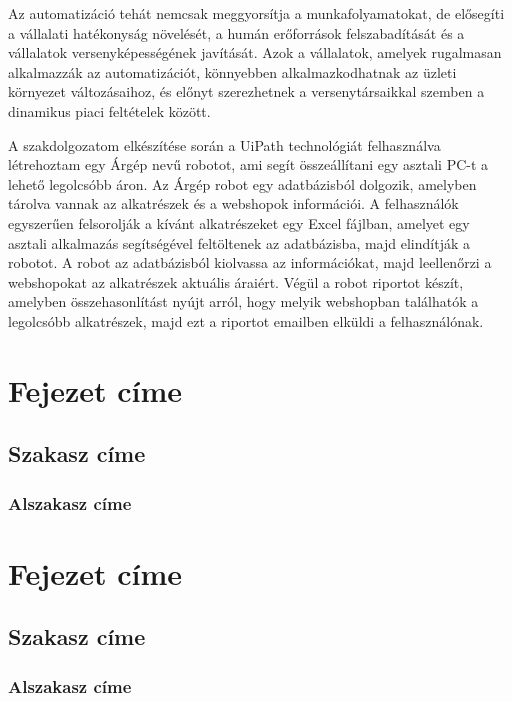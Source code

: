 \documentclass[
]{thesis-ekf}
\theoremstyle{definition}
\theoremstyle{remark}
\begin{document}
Az automatizáció tehát nemcsak meggyorsítja a munkafolyamatokat, de elősegíti a vállalati hatékonyság növelését, a humán erőforrások felszabadítását és a vállalatok versenyképességének javítását. Azok a vállalatok, amelyek rugalmasan alkalmazzák az automatizációt, könnyebben alkalmazkodhatnak az üzleti környezet változásaihoz, és előnyt szerezhetnek a versenytársaikkal szemben a dinamikus piaci feltételek között.

A szakdolgozatom elkészítése során a UiPath technológiát felhasználva létrehoztam egy Árgép nevű robotot, ami segít összeállítani egy asztali PC-t a lehető legolcsóbb áron. Az Árgép robot egy adatbázisból dolgozik, amelyben tárolva vannak az alkatrészek és a webshopok információi. 
A felhasználók egyszerűen felsorolják a kívánt alkatrészeket egy Excel fájlban, amelyet egy asztali alkalmazás segítségével feltöltenek az adatbázisba, majd elindítják a robotot. A robot az adatbázisból kiolvassa az információkat, majd leellenőrzi a webshopokat az alkatrészek aktuális áraiért. Végül a robot riportot készít, amelyben összehasonlítást nyújt arról, hogy melyik webshopban találhatók a legolcsóbb alkatrészek, majd ezt a riportot emailben elküldi a felhasználónak.

\chapter{Fejezet címe}
\section{Szakasz címe}
\subsection{Alszakasz címe}


\chapter{Fejezet címe}
\section{Szakasz címe}
\subsection{Alszakasz címe}
\end{document}
